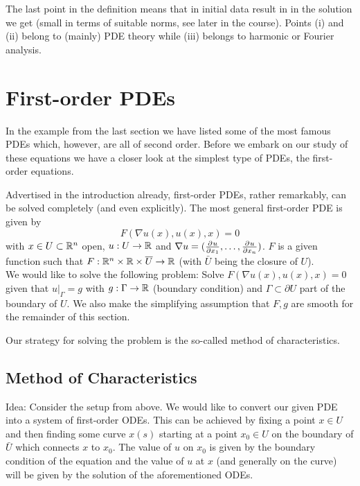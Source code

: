 \documentclass[11pt]{article}
\begin{document}
				The last point in the definition means that  in initial data result in  in the solution we get (small in terms of suitable norms, see later in the course). Points (i) and (ii) belong to (mainly) PDE theory while (iii) belongs to harmonic or Fourier analysis.


    \section{First-order PDEs}

		In the example from the last section we have listed some of the most famous PDEs which, however, are all of second order. Before we embark on our study of these equations we have a closer look at the simplest type of PDEs, the first-order equations. 
		
		Advertised in the introduction already, first-order PDEs, rather remarkably, can be solved completely (and even explicitly).
		The most general first-order PDE is given by
		\begin{equation*}
			F(\nabla u(x),u(x),x)=0
		\end{equation*}
		with $x\in U\subset\R^n$ open, $u:U\rightarrow\R$ and $\nabla u=(\del[]{u}{x_1},\dots,\del[]{u}{x_n})$. $F$ is a given function such that $F:\R^n\times\R\times\bar{U}\rightarrow\R$ (with $\bar{U}$ being the closure of $U$).
		\\

		We would like to solve the following problem: Solve $F(\nabla u(x),u(x),x)=0$ given that $u|_{\Gamma}=g$ with $g:\Gamma\rightarrow\R$ (boundary condition) and $\Gamma\subset\partial U$ part of the boundary of $U$. We also make the simplifying assumption that $F,g$ are smooth for the remainder of this section.
		
		Our strategy for solving the problem is the so-called method of characteristics.

		\subsection{Method of Characteristics}

			\noindent Idea: Consider the setup from above. We would like to convert our given PDE into a system of first-order ODEs. This can be achieved by fixing a point $x\in U$ and then finding some curve $x(s)$ starting at a point $x_0\in U$ on the boundary of $\bar{U}$ which connects $x$ to $x_0$. The value of $u$ on $x_0$ is given by the boundary condition of the equation and the value of $u$ at $x$ (and generally on the curve) will be given by the solution of the aforementioned ODEs.
			\\
\end{document}
